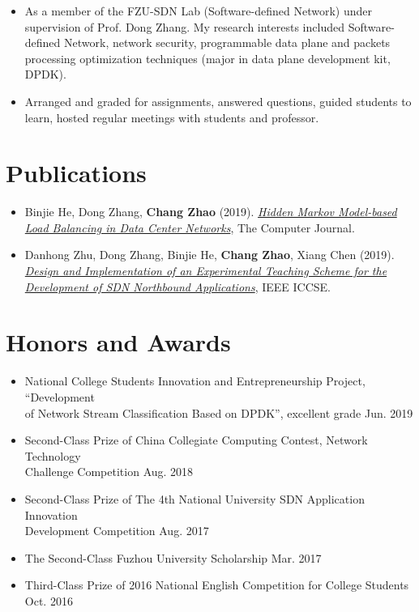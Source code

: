 \documentclass{resume}
\begin{document}
\begin{itemize}
  \item As a member of the FZU-SDN Lab (Software-defined Network) under supervision of Prof. Dong Zhang. My research
  interests included Software-defined Network, network security, programmable data plane and packets processing
  optimization techniques (major in data plane development kit, DPDK).
\end{itemize}

\begin{itemize}
  \item Arranged and graded for assignments, answered questions, guided students to learn, hosted regular meetings with students and professor.
\end{itemize}

\section{Publications}
\begin{itemize}
  \item Binjie He, Dong Zhang, \textbf{Chang Zhao} (2019). \href{https://academic.oup.com/comjnl/advance-article-abstract/doi/10.1093/comjnl/bxz142/5666159}{\textit{Hidden Markov Model-based Load Balancing in Data Center Networks}}, The
  Computer Journal.
  \item Danhong Zhu, Dong Zhang, Binjie He, \textbf{Chang Zhao}, Xiang Chen (2019). \href{https://ieeexplore.ieee.org/document/8845443}{\textit{Design and Implementation of an Experimental Teaching Scheme for the Development of SDN Northbound Applications}}, IEEE ICCSE.
\end{itemize}

\section{Honors and Awards}
\begin{itemize}
  \item National College Students Innovation and Entrepreneurship Project, ``Development \\of Network Stream Classification Based on DPDK'', excellent grade \hfill Jun. 2019
  \item Second-Class Prize of China Collegiate Computing Contest, Network Technology \\Challenge Competition \hfill Aug. 2018 
  \item Second-Class Prize of The 4th National University SDN Application Innovation \\Development Competition \hfill Aug. 2017
  \item The Second-Class Fuzhou University Scholarship \hfill Mar. 2017
  \item Third-Class Prize of 2016 National English Competition for College Students \hfill Oct. 2016
\end{itemize}
\end{document}
